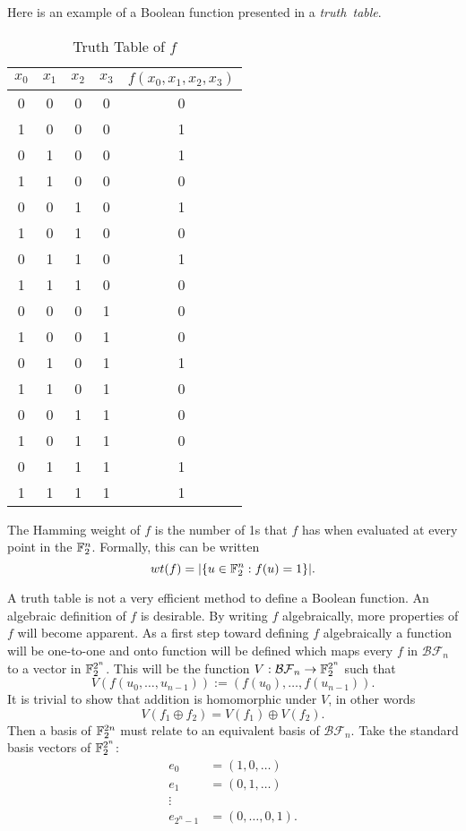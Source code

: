\par Here is an example of a Boolean function presented in a {\em truth\ table}.
\begin{table}
\label{tab:truth-table}
	\centering
  \begin{tabular}{|c|c|c|c|c|}
    \hline
    $x_0$&$x_1$&$x_2$&$x_3$&$f(x_0,x_1,x_2,x_3)$\\
    \hline
    0&0&0&0&0\\
    1&0&0&0&1\\
    0&1&0&0&1\\
    1&1&0&0&0\\
    0&0&1&0&1\\
    1&0&1&0&0\\
    0&1&1&0&1\\
    1&1&1&0&0\\
    0&0&0&1&0\\
    1&0&0&1&0\\
    0&1&0&1&1\\
    1&1&0&1&0\\
    0&0&1&1&0\\
    1&0&1&1&0\\
    0&1&1&1&1\\
    1&1&1&1&1\\
  	\hline
	\end{tabular}
	\caption{Truth Table of $f$}
\end{table}
\par The Hamming weight of $f$ is the number of 1s that $f$ has when evaluated
at every point in the $\mathbb{F}_2^n$. Formally, this can be written
\[
wt(f)=\lvert\{u\in\mathbb{F}_2^n:f(u)=1\}\rvert.
\]
\par A truth table is not a very efficient method to define a Boolean function.
An algebraic definition of $f$ is desirable. By writing $f$ algebraically, more
properties of $f$ will become apparent. As a first step toward defining $f$
algebraically a function will be one-to-one and onto function will be defined
which maps every $f$ in $\mathcal{BF}_n$ to a vector in $\mathbb{F}_2^{2^n}$. This
will be the function $V:\mathcal{BF}_n\rightarrow\mathbb{F}_2^{2^n}$ such that
\begin{equation}\label{eqn:bool-vector}
V(f(u_0,\dots,u_{n-1})):=(f(u_0),\dots,f(u_{n-1})).
\end{equation}
It is trivial to show that addition is homomorphic under $V$, in other words
\[
V(f_1\oplus f_2)=V(f_1)\oplus V(f_2).
\]
Then a basis of $\mathbb{F}_2^{2n}$ must relate to an equivalent basis of
$\mathcal{BF}_n$. Take the standard basis vectors of $\mathbb{F}_2^{2^n}$:
\begin{align*}
	e_0&=(1,0,\dots)\\
	e_1&=(0,1,\dots)\\
	\vdots \\
	e_{2^n-1}&=(0,\dots,0,1).
\end{align*}

